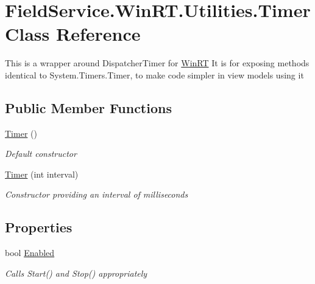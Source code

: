 \hypertarget{class_field_service_1_1_win_r_t_1_1_utilities_1_1_timer}{\section{Field\+Service.\+Win\+R\+T.\+Utilities.\+Timer Class Reference}
\label{class_field_service_1_1_win_r_t_1_1_utilities_1_1_timer}
}


This is a wrapper around Dispatcher\+Timer for \hyperlink{namespace_field_service_1_1_win_r_t}{Win\+R\+T} It is for exposing methods identical to System.\+Timers.\+Timer, to make code simpler in view models using it  


\subsection*{Public Member Functions}
\begin{DoxyCompactItemize}
\item 
\hyperlink{class_field_service_1_1_win_r_t_1_1_utilities_1_1_timer_a689221788c2c078ee3607219136e9414}{Timer} ()
\begin{DoxyCompactList}\small\item\em Default constructor \end{DoxyCompactList}\item 
\hyperlink{class_field_service_1_1_win_r_t_1_1_utilities_1_1_timer_aaee53e24de414fa75149365dc3aeb329}{Timer} (int interval)
\begin{DoxyCompactList}\small\item\em Constructor providing an interval of milliseconds \end{DoxyCompactList}\end{DoxyCompactItemize}
\subsection*{Properties}
\begin{DoxyCompactItemize}
\item 
bool \hyperlink{class_field_service_1_1_win_r_t_1_1_utilities_1_1_timer_a682b237a7c4880d87d592486334d9edb}{Enabled}
\begin{DoxyCompactList}\small\item\em Calls Start() and Stop() appropriately \end{DoxyCompactList}\end{DoxyCompactItemize}
